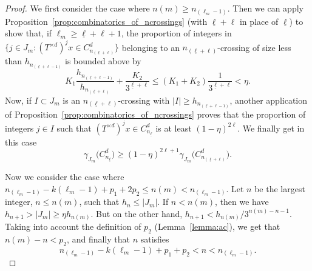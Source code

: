\documentclass[10pt]{amsart}
\theoremstyle{definition}\newtheorem{defi}[theo]{Definition}\newtheorem{rema}[theo]{Remark}\newtheorem{exam}[theo]{Example}\newtheorem{exem}[theo]{Example}\newtheorem{nota}[theo]{Notation}
\newcommand{\cd}{C^{d}}
\newcommand{\td}{T^{\times d}}
\newcommand{\lb}{\underline{\ell}}
\begin{document}
\begin{proof}
We first consider the case where $n(m)\ge n_{(\ell_m-1)}$. Then we can apply Proposition~\ref{prop:combinatorics_of_ncrossings} (with $\lb+\ell$ in place of $\lb$) to show that, if $\ell_m\ge \lb+\ell+1$, the proportion of integers in $\{j\in J_m: (\td)^jx\in \cd_{n_{(\lb+\ell)}}\}$ belonging to an $n_{(\lb + \ell)}$-crossing of size less than $h_{n_{(\lb+\ell-1)}}$ is bounded above by
\[
K_1 \frac{h_{n_{(\lb+\ell-1)}}}{h_{n_{(\lb+\ell)}}} + \frac{K_2}{3^{\lb+\ell}} \le (K_1+K_2)\frac{1}{3^{\lb+\ell}}<\eta.
\]
Now, if $I\subset J_m$ is an $n_{(\lb+\ell)}$-crossing with $|I|\ge h_{n_{(\lb+\ell-1)}}$, another application of Proposition~\ref{prop:combinatorics_of_ncrossings} proves that the proportion of integers $j\in I$ such that $(\td)^jx\in \cd_{n_{\lb}}$ is at least $(1-\eta)^{2\ell}$. We finally get in this case
\begin{equation}\label{eq:lemma4.4case1}
\gamma_{J_m}\bigl(\cd_{n_{\lb}}\bigr) \ge (1-\eta)^{2\ell+1} \gamma_{J_m} \bigl(\cd_{n_{(\lb+\ell)}}\bigr).
\end{equation}

Now we consider the case where $n_{(\ell_m-1)}-k(\ell_m-1) + p_1+ 2p_2 \le n(m)< n_{(\ell_m-1)}$. Let $n$ be the largest integer, $n\le n(m)$, such that $h_n\le |J_m|$. If $n<n(m)$, then we have $h_{n+1}> |J_m|\ge \eta h_{n(m)}$. But on the other hand, $h_{n+1}<h_{n(m)}/3^{n(m)-n-1}$. Taking into account the definition of $p_2$ (Lemma~\ref{lemma:ac}), we get that $n(m)-n<p_2$, and finally that $n$ satisfies
\[
n_{(\ell_m-1)}-k(\ell_m-1) + p_1+ p_2 < n < n_{(\ell_m-1)}.
\]


\end{proof}
\end{document}
